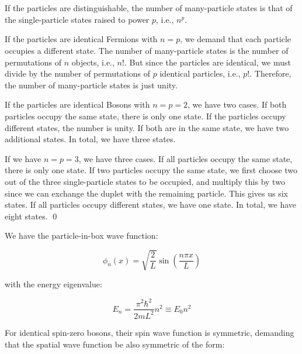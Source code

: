 \documentclass[12pt]{article}
\begin{document}



\pagebreak
\section*{}



If the particles are distinguishable, the number of many-particle states is that of the single-particle states raised to power $p$, i.e., $n^{p}$.

If the particles are identical Fermions with $n = p$, we demand that each particle occupies a different state. The number of many-particle states is the number of permutations of $n$ objects, i.e., $n!$. But since the particles are identical, we must divide by the number of permutations of $p$ identical particles, i.e., $p!$. Therefore, the number of many-particle states is just unity.

If the particles are identical Bosons with $n = p = 2$, we have two cases. If both particles occupy the same state, there is only one state. If the particles occupy different states, the number is unity. If both are in the same state, we have two additional states. In total, we have three states.

If we have $n = p = 3$, we have three cases. If all particles occupy the same state, there is only one state. If two particles occupy the same state, we first choose two out of the three single-particle states to be occupied, and multiply this by two since we can exchange the duplet with the remaining particle. This gives us six states. If all particles occupy different states, we have one state. In total, we have eight states.
\qed


We have the particle-in-box wave function:

\begin{equation}
    \phi_{n}(x) = \sqrt{\frac{2}{L}} \sin{\left(\frac{n\pi x}{L}\right)}
\end{equation}

with the energy eigenvalue:

\begin{equation}
    E_{n} = \frac{\pi^{2}\hbar^{2}}{2mL^{2}} n^{2} \equiv E_{0}n^{2}
\end{equation}

For identical spin-zero bosons, their spin wave function is symmetric, demanding that the spatial wave function be also symmetric of the form:
\end{document}
